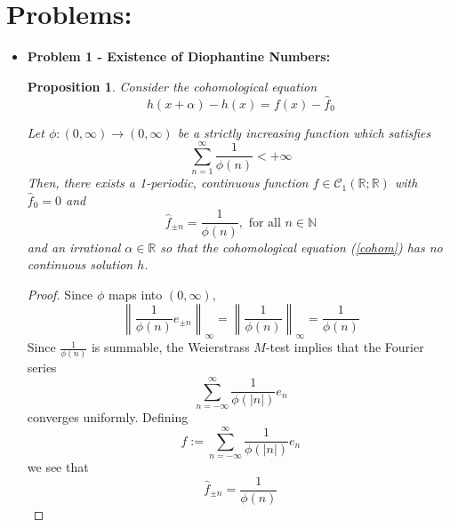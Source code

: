 \documentclass[12pt, reqno]{amsart}
\newtheorem{prop}{Proposition}[section]
\theoremstyle{definition}
\theoremstyle{remark}
\begin{document}

\section{Problems:} 

\begin{itemize}

\item {\bf{Problem 1 - Existence of Diophantine Numbers:}} %

\begin{prop}
    Consider the cohomological equation
    \begin{equation}\label{cohom}
        h(x+ \alpha)-h(x)=f(x)-\hat f_{0}
    \end{equation}
    
    Let $\phi:(0,\infty)\rightarrow (0,\infty)$ be a strictly increasing function which satisfies $$\sum_{n=1}^{\infty} \frac{1}{\phi(n)}<+\infty$$Then, there exists a 1-periodic, continuous function $f\in\mathcal{C}_{1}(\mathbb{R};\mathbb{R})$ with $\hat f_{0}=0$ and $$\hat f_{\pm n}= \frac{1}{\phi(n)},\text{ for all }n\in \mathbb{N}$$and an irrational $\alpha\in \mathbb{R}$ so that the cohomological equation (\ref{cohom}) has no continuous solution $h$.
\end{prop}

\begin{proof}
    Since $\phi$ maps into $(0,\infty)$, $$\left\|\frac{1}{\phi(n)}e_{\pm n}\right\|_{\infty}= \left\| \frac{1}{\phi(n)}\right\|_{\infty}= \frac{1}{\phi(n)}$$
Since $\frac{1}{\phi(n)}$ is summable, the Weierstrass $M$-test implies that the Fourier series $$\sum_{n=-\infty}^{\infty} \frac{1}{\phi(|n|)}e_{n}$$converges uniformly. Defining $$f:=\sum_{n=-\infty}^{\infty} \frac{1}{\phi(|n|)}e_{n}$$
we see that $$\hat f_{\pm n}= \frac{1}{\phi(n)}$$




\end{proof}
\end{itemize}
\end{document}
